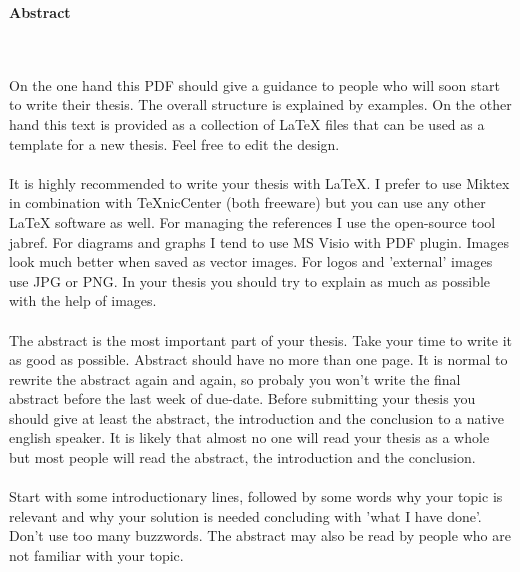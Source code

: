 \thispagestyle{empty}
\vspace*{1.0cm}

\begin{center}
    \textbf{Abstract}
\end{center}

\vspace*{0.5cm}

\noindent 
\\
\\
On the one hand this PDF should give a guidance to people who will soon start to write their thesis. The overall structure is explained by examples. On the other hand this text is provided as a collection of LaTeX files that can be used as a template for a new thesis. Feel free to edit the design.
\\
\\
It is highly recommended to write your thesis with LaTeX. I prefer to use Miktex in combination with TeXnicCenter (both freeware) but you can use any other LaTeX software as well. For managing the references I use the open-source tool jabref. For diagrams and graphs I tend to use MS Visio with PDF plugin. Images look much better when saved as vector images. For logos and 'external' images use JPG or PNG. In your thesis you should try to explain as much as possible with the help of images.
\\
\\
The abstract is the most important part of your thesis. Take your time to write it as good as possible. Abstract should have no more than one page. It is normal to rewrite the abstract again and again, so  probaly you won't write the final abstract before the last week of due-date. Before submitting your thesis you should give at least the abstract, the introduction and the conclusion to a native english speaker. It is likely that almost no one will read your thesis as a whole but most people will read the abstract, the introduction and the conclusion.
\\
\\
Start with some introductionary lines, followed by some words why your topic is relevant and why your solution is needed concluding with 'what I have done'. Don't use too many buzzwords. The abstract may also be read by people who are not familiar with your topic.
